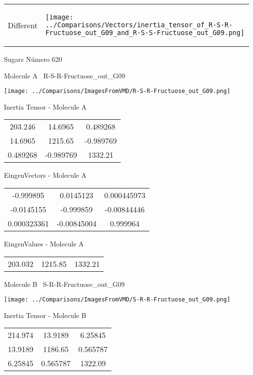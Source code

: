 \vtab[-5mm]
\begin{tabular}{*{2}{m{}}}
\begin{center}
\textcolor{NavyBlue}{\Large Different}
\end{center}
&
\begin{center}
\texttt{[image: ../Comparisons/Vectors/inertia\_tensor\_of\_R-S-R-Fructuose\_out\_G09\_and\_R-S-S-Fructuose\_out\_G09.png]}
\end{center}
\end{tabular}

 \newpage

\vtab[-3cm]
\begin{center}
{\large Sugars \tab Número 620}
\end{center}
\begin{multicols}{2}
\begin{center}

Molecule A \
R-S-R-Fructuose\_out\_G09

\texttt{[image: ../Comparisons/ImagesFromVMD/R-S-R-Fructuose\_out\_G09.png]}

Inertia Tensor - Molecule A \\
\begin{tabular}{|c c c|}
203.246	 & 	14.6965	 & 	0.489268	 \\
14.6965	 & 	1215.65	 & 	-0.989769	 \\
0.489268	 & 	-0.989769	 & 	1332.21
\end{tabular}

\vtab
 EingenVectors - Molecule A     \\
\begin{tabular}{|c c c|}
-0.999895	 & 	0.0145123	 & 	0.000445973	 \\
-0.0145155	 & 	-0.999859	 & 	-0.00844446	 \\
0.000323361	 & 	-0.00845004	 & 	0.999964
\end{tabular}

\vtab
 EingenValues - Molecule A     \\
\begin{tabular}{|c c c|}
203.032	 & 	1215.85	 & 	1332.21	 \\
\end{tabular}
\columnbreak

Molecule B \
S-R-R-Fructuose\_out\_G09

\texttt{[image: ../Comparisons/ImagesFromVMD/S-R-R-Fructuose\_out\_G09.png]}

Inertia Tensor - Molecule B \\
\begin{tabular}{|c c c|}
214.974	 & 	13.9189	 & 	6.25845	 \\
13.9189	 & 	1186.65	 & 	0.565787	 \\
6.25845	 & 	0.565787	 & 	1322.09
\end{tabular}


\end{center}
\end{multicols}
